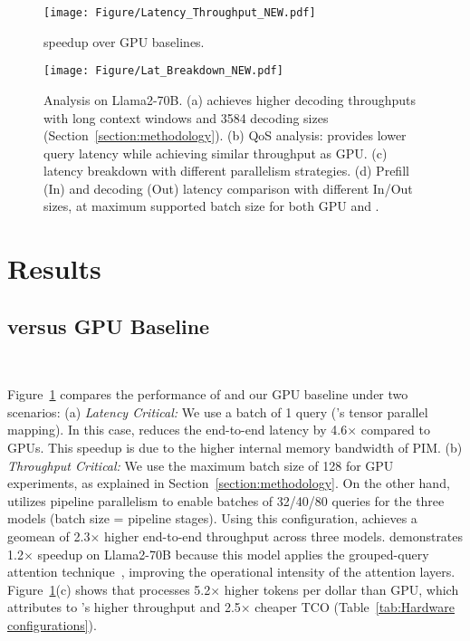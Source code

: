 \begin{figure}[!b]
    \centering
    \texttt{[image: Figure/Latency\_Throughput\_NEW.pdf]}
    \caption{\att{} speedup over GPU baselines.}
    \label{fig:Main_results}
\end{figure}


\begin{figure*}[t]
	\centering
  	\texttt{[image: Figure/Lat\_Breakdown\_NEW.pdf]}
	\caption{Analysis on Llama2-70B. 
 (a) \att{} achieves higher decoding throughputs with long context windows and 3584 decoding sizes (Section~\ref{section:methodology}). 
 (b) QoS analysis: \att{} provides lower query latency while achieving similar throughput as GPU. 
 (c) \att{} latency breakdown with different parallelism strategies.
 (d) Prefill (In) and decoding (Out) latency comparison with different In/Out sizes, at maximum supported batch size for both GPU and \att{}.
 }
\label{fig:Combo_Main_Lat_Breakdown}
\end{figure*}


\section{Results}

\subsection{\att{} versus GPU Baseline}~\label{subsec:main_results}

Figure~\ref{fig:Main_results} compares the performance of \att{} and our GPU baseline under two scenarios:
(a) \textit{Latency Critical:} We use a batch of 1 query (\att{}'s tensor parallel mapping).
In this case, \att{} reduces the end-to-end latency by 4.6$\times$ compared to GPUs.
This speedup is due to the higher internal memory bandwidth of PIM.
(b) \textit{Throughput Critical:} We use the maximum batch size of 128 for GPU experiments, as explained in Section~\ref{section:methodology}.
On the other hand, \att{} utilizes pipeline parallelism to enable batches of 32/40/80 queries for the three models (batch size = pipeline stages).
Using this configuration, \att{} achieves a geomean of 2.3$\times$ higher end-to-end throughput across three models.
\att{} demonstrates 1.2$\times$ speedup on Llama2-70B because this model applies the grouped-query attention technique~\cite{gqa}, improving the operational intensity of the attention layers.
Figure~\ref{fig:Main_results}(c) shows that \att{} processes 5.2$\times$ higher tokens per dollar than GPU, which attributes to \att{}'s higher throughput and 2.5$\times$ cheaper TCO (Table~\ref{tab:Hardware configurations}).





